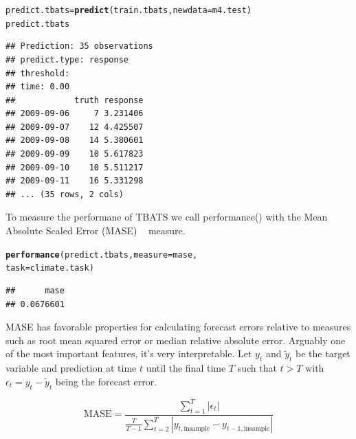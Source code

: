 \documentclass[12pt]{article}\usepackage[]{graphicx}\usepackage[]{color}
\makeatletter
\newcommand{\hlstd}[1]{\textcolor[rgb]{0.345,0.345,0.345}{#1}}%
\newcommand{\hlkwb}[1]{\textcolor[rgb]{0.69,0.353,0.396}{#1}}%
\newcommand{\hlkwc}[1]{\textcolor[rgb]{0.333,0.667,0.333}{#1}}%
\newcommand{\hlkwd}[1]{\textcolor[rgb]{0.737,0.353,0.396}{\textbf{#1}}}%
\newenvironment{kframe}{%
 \def\at@end@of@kframe{}%
 \ifinner\ifhmode%
  \def\at@end@of@kframe{\end{minipage}}%
  \begin{minipage}{\columnwidth}%
 \fi\fi%
 \def\FrameCommand##1{\hskip\@totalleftmargin \hskip-\fboxsep
 \colorbox{shadecolor}{##1}\hskip-\fboxsep
     \hskip-\linewidth \hskip-\@totalleftmargin \hskip\columnwidth}%
 \MakeFramed {\advance\hsize-\width
   \@totalleftmargin\z@ \linewidth\hsize
   \@setminipage}}%
 {\par\unskip\endMakeFramed%
 \at@end@of@kframe}
\newenvironment{knitrout}{}{} %
\theoremstyle{definition}
\newcommand\code{\@codex}
\def\@codex#1{{\normalfont\ttfamily\hyphenchar\font=-1 #1}}
\makeatother
\begin{document}
\singlespacing
\begin{knitrout}
\color{fgcolor}\begin{kframe}
\begin{alltt}
\hlstd{predict.tbats} \hlkwb{=} \hlkwd{predict}\hlstd{(train.tbats,} \hlkwc{newdata} \hlstd{= m4.test)}
\hlstd{predict.tbats}
\end{alltt}
\begin{verbatim}
## Prediction: 35 observations
## predict.type: response
## threshold: 
## time: 0.00
##            truth response
## 2009-09-06     7 3.231406
## 2009-09-07    12 4.425507
## 2009-09-08    14 5.380601
## 2009-09-09    10 5.617823
## 2009-09-10    10 5.511217
## 2009-09-11    16 5.331298
## ... (35 rows, 2 cols)
\end{verbatim}
\end{kframe}
\end{knitrout}
\doublespacing

To measure the performane of TBATS we call \code{performance()} with the Mean Absolute Scaled Error (MASE) ~\cite{Hyndman2006} measure.

\singlespacing
\begin{knitrout}
\color{fgcolor}\begin{kframe}
\begin{alltt}
\hlkwd{performance}\hlstd{(predict.tbats,} \hlkwc{measure} \hlstd{= mase,}
            \hlkwc{task} \hlstd{= climate.task)}
\end{alltt}
\begin{verbatim}
##      mase 
## 0.0676601
\end{verbatim}
\end{kframe}
\end{knitrout}
\doublespacing
MASE has favorable properties for calculating forecast errors relative to measures such as root mean squared error or median relative absolute error. Arguably one of the most important features, it's very interpretable. Let $y_t$ and $\tilde{y}_t$ be the target variable and prediction at time $t$ until the final time $T$ such that $t>T$ with $\epsilon_t = y_t - \tilde{y}_t$ being the forecast error. 

\begin{equation}
\text{MASE} = \frac{\sum_{t=1}^T |\epsilon_t|}{\frac{T}{T-1} \sum_{t=2}^T |y_{t, \text{insample}} - y_{t-1, \text{insample}}|}
\end{equation}
\end{document}
